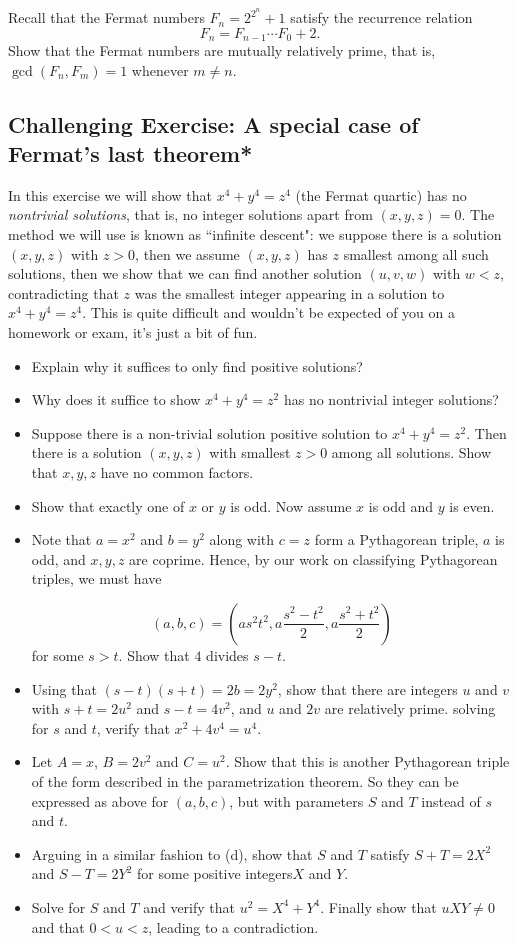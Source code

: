 \documentclass[11pt,dvipsnames]{book}
\numberwithin{figure}{section} %
\numberwithin{table}{section} %
\begin{document}
\begin{exercise} Recall that the Fermat numbers $F_{n}=2^{2^{n}}+1$ satisfy the recurrence relation
\[
F_{n} = F_{n-1}\cdots F_{0}+2.
\]
Show that the Fermat numbers are mutually relatively prime, that is, $\gcd(F_{n},F_{m})=1$ whenever $m\neq n$.

\end{exercise}

\subsection{  Challenging Exercise: A special case of Fermat's last theorem*}

In this exercise we will show that $x^4 + y^4 = z^4$ (the Fermat quartic) has no {\it nontrivial solutions}, that is, no integer solutions apart from $(x,y,z)=0$. The method we will use is known as ``infinite descent": we suppose there is a solution $(x,y,z)$ with $z>0$, then we assume $(x,y,z)$ has $z$ smallest among all such solutions, then we show that we can find another solution $(u,v,w)$ with $w<z$, contradicting that $z$ was the smallest integer appearing in a solution to $x^4+y^4=z^4$. This is quite difficult and wouldn't be expected of you on a homework or exam, it's just a bit of fun.
\begin{itemize}
\item Explain why it suffices to only find positive solutions?
\item Why does it suffice to show $x^4+y^4=z^2$ has no nontrivial integer solutions?
\item Suppose there is a non-trivial solution positive solution to  $x^4 + y^4 = z^2$. Then there is a solution $(x,y,z)$ with smallest $z>0$ among all solutions. Show that $x,y,z$ have no common factors.
\item Show that exactly one of $x$ or $y$ is odd. Now assume $x$ is odd and $y$ is even.
\item Note that $a=x^2$ and $b=y^2$ along with $c=z$ form a Pythagorean triple, $a$ is odd, and $x,y,z$ are coprime.  Hence, by our work on classifying Pythagorean triples, we must have

\[
(a,b,c) = \left( as^2 t^2, a\frac{s^2-t^2}{2}, a\frac{s^{2}+t^{2}}{2}\right)
\]
for some $s>t$. Show that $4$ divides $s-t$.
\item Using that $(s-t)(s+t)=2b=2y^2$, show that there are integers $u$ and $v$ with $s+t = 2u^2$ and $s-t=4v^2$, and $u$ and $2v$ are relatively prime. solving for $s$ and $t$, verify that $x^2+4v^4 = u^4$.
\item Let $A = x$, $B = 2v^2$ and $C = u^2$. Show that this is another Pythagorean triple of the form described in the parametrization theorem. So they can be expressed as above for $(a,b,c)$, but with parameters $S$ and $T$ instead of $s$ and $t$.
\item Arguing in a similar fashion to (d), show that $S$ and $T$ satisfy $S+T = 2X^2$ and $S-T=2Y^2$ for some positive integers$ X$ and $Y$.
\item Solve for $S$ and $T$ and verify that $u^2 = X^4 + Y^4$. Finally show that $uXY\neq 0$ and that $0 < u < z$, leading to a contradiction.
\end{itemize}
\end{document}
